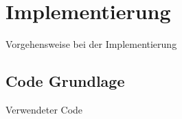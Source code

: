 \chapter{Implementierung}%

\label{cha:Implementierung}

Vorgehensweise bei der Implementierung


\section{Code Grundlage}
Verwendeter Code 


